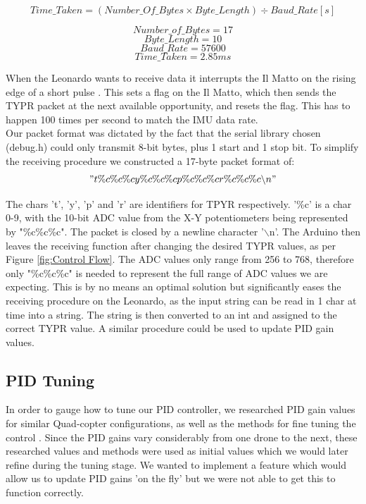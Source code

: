 \documentclass[a4paper,11pt]{article}
\begin{document}
\begin{equation}
Time\_Taken = (Number\_Of\_Bytes \times Byte\_Length) \div Baud\_Rate [s]
\label{eqn:Data Rate}
\end{equation} 

\[Number\_of\_Bytes = 17\]
\[Byte\_Length = 10\]
\[Baud\_Rate = 57600\]
\[Time\_Taken = 2.85ms\]

 When the Leonardo wants to receive data it interrupts the Il Matto on the rising edge of a short pulse \cite{Pulse Function}. This sets a flag \cite{Serial Flag} on the Il Matto, which then sends the TYPR packet at the next available opportunity, and resets the flag. This has to happen 100 times per second to match the IMU data rate.\\
Our packet format was dictated by the fact that the serial library chosen (debug.h) could only transmit 8-bit bytes, plus 1 start and 1 stop bit. To simplify the receiving procedure we constructed a 17-byte packet format of:
\begin{equation}
"t\%c\%c\%cy\%c\%c\%cp\%c\%c\%cr\%c\%c\%c\backslash n"
\label{eqn:Packet Format}
\end{equation}

The chars 't', 'y', 'p' and 'r' are identifiers for TPYR respectively. '\%c' is a char 0-9, with the 10-bit ADC value from the X-Y potentiometers being represented by "\%c\%c\%c". The packet is closed by a newline character '$\backslash$n'. The Arduino then leaves the receiving function \cite{serialEvent} after changing the desired TYPR values, as per Figure \ref{fig:Control Flow}. The ADC values only range from 256 to 768, therefore only "\%c\%c\%c" is needed to represent the full range of ADC values we are expecting. This is by no means an optimal solution but significantly eases the receiving procedure on the Leonardo, as the input string can be read in 1 char at time into a string. The string is then converted to an int and assigned to the correct TYPR value. A similar procedure could be used to update PID gain values.  


\subsection{PID Tuning}
In order to gauge how to tune our PID controller, we researched PID gain values for similar Quad-copter configurations, as well as the methods for fine tuning the control \cite{PID tuning guide}\cite{Quadcopter Control Theory}. Since the PID gains vary considerably from one drone to the next, these researched values and methods were used as initial values which we would later refine during the tuning stage. We wanted to implement a feature which would allow us to update PID gains 'on the fly' but we were not able to get this to function correctly.
\end{document}

